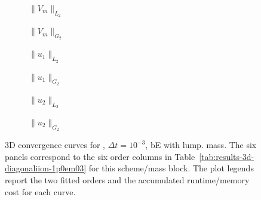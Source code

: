 \begin{figure}[p]
\centering
\begin{subfigure}{0.485\linewidth}
\centering
{}
\caption{$\|V_m\|_{L_2}$}
\label{fig:results-3d-diagonaliion-1p0em03-backwardeuler-lumped-a}
\end{subfigure}
\hfill
\begin{subfigure}{0.485\linewidth}
\centering
{}
\caption{$\|V_m\|_{G_2}$}
\label{fig:results-3d-diagonaliion-1p0em03-backwardeuler-lumped-b}
\end{subfigure}
\par\vspace{0.8em}
\begin{subfigure}{0.485\linewidth}
\centering
{}
\caption{$\|u_1\|_{L_2}$}
\label{fig:results-3d-diagonaliion-1p0em03-backwardeuler-lumped-c}
\end{subfigure}
\hfill
\begin{subfigure}{0.485\linewidth}
\centering
{}
\caption{$\|u_1\|_{G_2}$}
\label{fig:results-3d-diagonaliion-1p0em03-backwardeuler-lumped-d}
\end{subfigure}
\par\vspace{0.8em}
\begin{subfigure}{0.485\linewidth}
\centering
{}
\caption{$\|u_2\|_{L_2}$}
\label{fig:results-3d-diagonaliion-1p0em03-backwardeuler-lumped-e}
\end{subfigure}
\hfill
\begin{subfigure}{0.485\linewidth}
\centering
{}
\caption{$\|u_2\|_{G_2}$}
\label{fig:results-3d-diagonaliion-1p0em03-backwardeuler-lumped-f}
\end{subfigure}
\caption{3D convergence curves for , $\Delta t=10^{-3}$, bE with lump. mass. The six panels correspond to the six order columns in Table~\ref{tab:results-3d-diagonaliion-1p0em03} for this scheme/mass block. The plot legends report the two fitted orders and the accumulated runtime/memory cost for each curve.}
\label{fig:results-3d-diagonaliion-1p0em03-backwardeuler-lumped}
\end{figure}
\FloatBarrier

